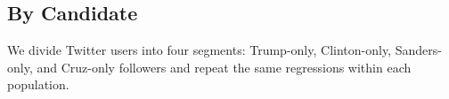 \documentclass[letterpaper]{article}
\begin{document}

\subsection{By Candidate} 

We divide Twitter users into four segments: Trump-only, Clinton-only, Sanders-only, and Cruz-only followers and repeat the same regressions within each population. 
\end{document}
